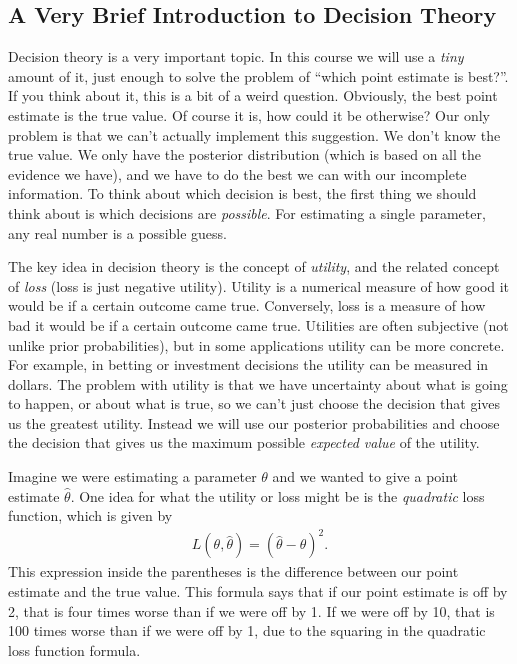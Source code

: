 \subsection{A Very Brief Introduction to Decision Theory}
Decision theory is a very important topic. In this course we will use a
{\it tiny} amount of it, just enough to solve the problem of ``which point
estimate is best?''. If you think about it, this is a bit of a weird question.
Obviously, the best point estimate is the true value. Of course it is, how could it
be otherwise? Our only problem is that we can't actually implement this suggestion.
We don't know the true value. We only have the posterior distribution
(which is based on all the evidence we have), and we have to do 
the best we can with our incomplete information. To think about which decision is best,
the first thing we should think
about is which decisions are {\it possible}. For estimating a single parameter, any
real number is a possible guess.

The key idea in decision theory is the concept of {\it utility}, and the related
concept of {\it loss} (loss is just negative utility). Utility is
a numerical measure of how good it would be if a certain outcome came true.
Conversely, loss is a measure of how bad it would be if a certain outcome
came true.
Utilities are often subjective (not unlike prior probabilities), but in some
applications utility can be more concrete. For example, in betting or investment
decisions the utility can be measured in dollars. The problem with utility is
that we have uncertainty about what is going to happen, or about what is true,
so we can't just choose the decision that gives us the greatest utility. Instead
we will use our posterior probabilities and choose the decision that gives us
the maximum possible {\it expected value} of the utility.

Imagine we were estimating a parameter $\theta$ and we wanted to give a
point estimate $\hat{\theta}$. One idea for what the utility or loss might be is the
{\it quadratic} loss function, which is given by
\begin{eqnarray}
L(\theta, \hat{\theta}) = \left(\hat{\theta} - \theta\right)^2.
\end{eqnarray}
This expression inside the parentheses is the difference between our point estimate
and the true value. This formula says that if our point estimate is off by 2,
that is four times worse than if we were off by 1. If we were off by 10, that is
100 times worse than if we were off by 1, due to the squaring in the quadratic
loss function formula.

